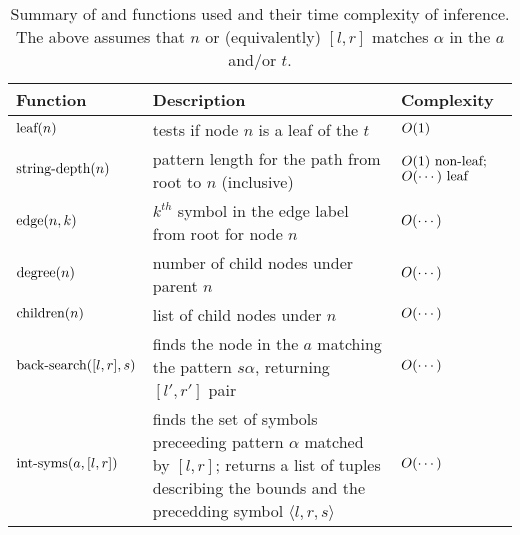 \documentclass[11pt,a4paper]{article}
\begin{document}
\begin{table*}[htpb]
\footnotesize
\begin{tabular}{p{}p{}p{}}
\toprule
Function & Description & Complexity \\
\midrule
$\leaf{t}{n}$ & tests if node $n$ is a leaf of the  $t$ & $\Order{1}$ \\
$\depth{t}{n}$ & pattern length for the path from root to $n$ (inclusive) & $\Order{1} \text{~non-leaf;}$ $\Order{\cdots} \text{~leaf}$\\
$\edge{t}{n}{k}$ & $k^{th}$ symbol in the edge label from root for node $n$ &  $\Order{\cdots}$ \\
$\degree{t}{n}$ &  number of child nodes under parent $n$  &  $\Order{\cdots}$ \\
$\children{t}{n}$ & list of child nodes under $n$  &  $\Order{\cdots}$ \\
$\backwardsearch{a}{l}{r}{s}$ & finds the node in the  $a$ matching the pattern $s \alpha$, returning $[l',r']$ pair  &  $\Order{\cdots}$ \\
$\intervalsymbols{a}{l}{r}$ & finds the set of symbols preceeding pattern $\alpha$ matched by $[l, r]$; returns a list of tuples describing the bounds and the precedding symbol $\langle l, r, s\rangle$  &  $\Order{\cdots}$ \\
\bottomrule
\end{tabular}
\caption{Summary of \CSA and \CST functions used and their time complexity of inference. The above assumes that $n$ or (equivalently) $[l, r]$ matches $\alpha$ in the \CSA $a$ and/or \CST $t$.}
\end{table*}

\begin{table}
\caption{Tokens and sentence counts refer to the training partition. }\label{fig:data}
\end{table}
\end{document}
